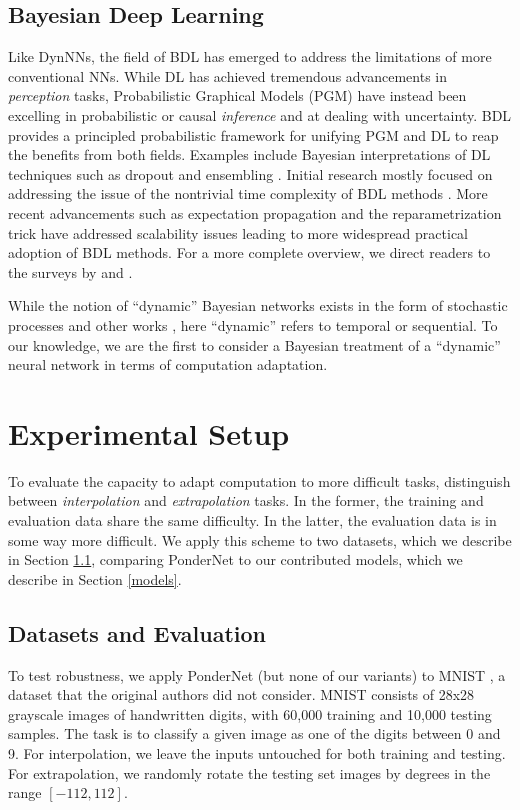 \documentclass{article}
\begin{document}
\subsection{Bayesian Deep Learning}
Like DynNNs, the field of BDL has emerged to address the limitations of more conventional NNs. While DL has achieved tremendous advancements in \textit{perception} tasks, Probabilistic Graphical Models (PGM) have instead been excelling in probabilistic or causal \textit{inference} and at dealing with uncertainty. BDL provides a principled probabilistic framework for unifying PGM and DL to reap the benefits from both fields. Examples include Bayesian interpretations of DL techniques such as dropout \citep{gal_dropout_2016} and ensembling \citep{lakshminarayanan_simple_2017}. Initial research mostly focused on addressing the issue of the nontrivial time complexity of BDL methods \citep{mackay_practical_1992, neal_bayesian_2012}. More recent advancements such as expectation propagation \citep{hernandez-lobato_probabilistic_2015} and the reparametrization trick \citep{blundell_weight_2015, kingma_auto-encoding_2014} have addressed scalability issues leading to more widespread practical adoption of BDL methods. For a more complete overview, we direct readers to the surveys by \citet{wang_survey_2020} and \citet{fortuin_priors_2022}.

While the notion of ``dynamic'' Bayesian networks exists in the form of stochastic processes and other works \citep{rimella_dynamic_2020}, here ``dynamic'' refers to temporal or sequential. To our knowledge, we are the first to consider a Bayesian treatment of a ``dynamic'' neural network in terms of computation adaptation.

\section{Experimental Setup}\label{experimental-setup}

To evaluate the capacity to adapt computation to more difficult tasks, \citet{banino_pondernet_2021} distinguish between \textit{interpolation} and \textit{extrapolation} tasks. In the former, the training and evaluation data share the same difficulty. In the latter, the evaluation data is in some way more difficult. We apply this scheme to two datasets, which we describe in Section \ref{datasets}, comparing PonderNet to our contributed models, which we describe in Section \ref{models}.

\subsection{Datasets and Evaluation} \label{datasets}
To test robustness, we apply PonderNet (but none of our variants) to MNIST \citep{deng_mnist_2012}, a dataset that the original authors did not consider. MNIST consists of 28x28 grayscale images of handwritten digits, with 60,000 training and 10,000 testing samples. The task is to classify a given image as one of the digits between 0 and 9. For interpolation, we leave the inputs untouched for both training and testing. For extrapolation, we randomly rotate the testing set images by degrees in the range $[-112, 112]$.
\end{document}
